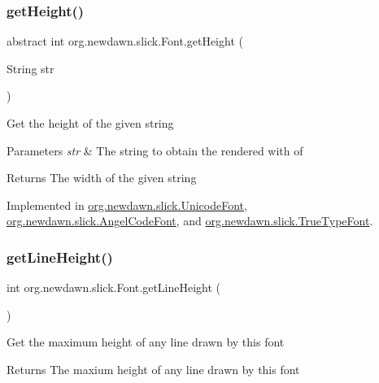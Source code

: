 \subsubsection{\texorpdfstring{get\+Height()}{getHeight()}}
{\footnotesize\ttfamily abstract int org.\+newdawn.\+slick.\+Font.\+get\+Height (\begin{DoxyParamCaption}\item[{String}]{str }\end{DoxyParamCaption})\hspace{0.3cm}{\ttfamily [abstract]}}

Get the height of the given string


\begin{DoxyParams}{Parameters}
{\em str} & The string to obtain the rendered with of \\
\hline
\end{DoxyParams}
\begin{DoxyReturn}{Returns}
The width of the given string 
\end{DoxyReturn}


Implemented in \mbox{\hyperlink{classorg_1_1newdawn_1_1slick_1_1_unicode_font_a409f20ee363890da63571bbc46567808}{org.\+newdawn.\+slick.\+Unicode\+Font}}, \mbox{\hyperlink{classorg_1_1newdawn_1_1slick_1_1_angel_code_font_ad962179705beb6355e270ebc65b04b2a}{org.\+newdawn.\+slick.\+Angel\+Code\+Font}}, and \mbox{\hyperlink{classorg_1_1newdawn_1_1slick_1_1_true_type_font_a077395a15b52dd9b4831b3ce8d6c8430}{org.\+newdawn.\+slick.\+True\+Type\+Font}}.

\mbox{\label{interfaceorg_1_1newdawn_1_1slick_1_1_font_aeb4b7770f47c5e2631d84b35924376d7}} 
\subsubsection{\texorpdfstring{get\+Line\+Height()}{getLineHeight()}}
{\footnotesize\ttfamily int org.\+newdawn.\+slick.\+Font.\+get\+Line\+Height (\begin{DoxyParamCaption}{ }\end{DoxyParamCaption})}

Get the maximum height of any line drawn by this font

\begin{DoxyReturn}{Returns}
The maxium height of any line drawn by this font 
\end{DoxyReturn}


